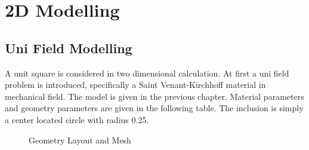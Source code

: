 \section{2D Modelling}
\subsection{Uni Field Modelling}
A unit square is considered in two dimensional calculation. At first a uni field problem is introduced, specifically a Saint Venant-Kirchhoff material in mechanical field. The model is given in the previous chapter. Material parameters and geometry parameters are given in the following table. The inclusion is simply a center located circle with radius 0.25. \\

\begin{figure}[h]
  \centering
  \caption{Geometry Layout and Mesh}
  \label{fig: inc}
\end{figure} 

